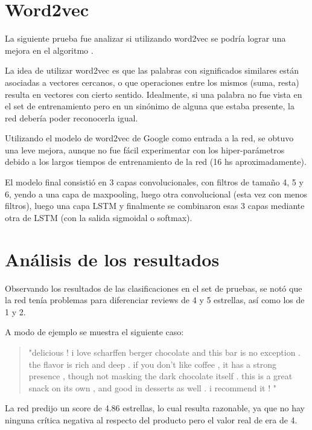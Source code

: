 \section{Word2vec}

La siguiente prueba fue analizar si utilizando word2vec se podr\'ia lograr una mejora en el
algoritmo \cite{w2v_text_classification}.

La idea de utilizar word2vec es que las palabras con significados similares est\'an asociadas a
vectores cercanos, o que operaciones entre los mismos (suma, resta) resulta en vectores con cierto
sentido. Idealmente, si una palabra no fue vista en el set de entrenamiento pero en un sin\'onimo de
alguna que estaba presente, la red deber\'ia poder reconocerla igual.

Utilizando el modelo de word2vec de Google \cite{word2vec_google} como entrada a la red, se obtuvo
una leve mejora, aunque no fue f\'acil experimentar con los hiper-par\'ametros debido a los largos
tiempos de entrenamiento de la red (16 hs aproximadamente).

El modelo final consisti\'o en 3 capas convolucionales, con filtros de tama\~no 4, 5 y 6, yendo a
una capa de maxpooling, luego otra convolucional (esta vez con menos filtros), luego una capa LSTM
y finalmente se combinaron esas 3 capas mediante otra de LSTM (con la salida sigmoidal o softmax).



\section{An\'alisis de los resultados}

Observando los resultados de las clasificaciones en el set de pruebas, se not\'o que la red ten\'ia
problemas para diferenciar reviews de 4 y 5 estrellas, as\'i como los de 1 y 2.

A modo de ejemplo se muestra el siguiente caso:

\blockquote{
  "delicious ! i love scharffen berger chocolate and this bar is no exception . the flavor is rich and deep . if you don't like coffee , it has a strong presence , though not   masking the dark chocolate itself . this is a great snack on its own , and good in desserts as well . i recommend it ! "
}

La red predijo un score de 4.86 estrellas, lo cual resulta razonable, ya que no hay ninguna cr\'itica
negativa al respecto del producto pero el valor real de era de 4.

